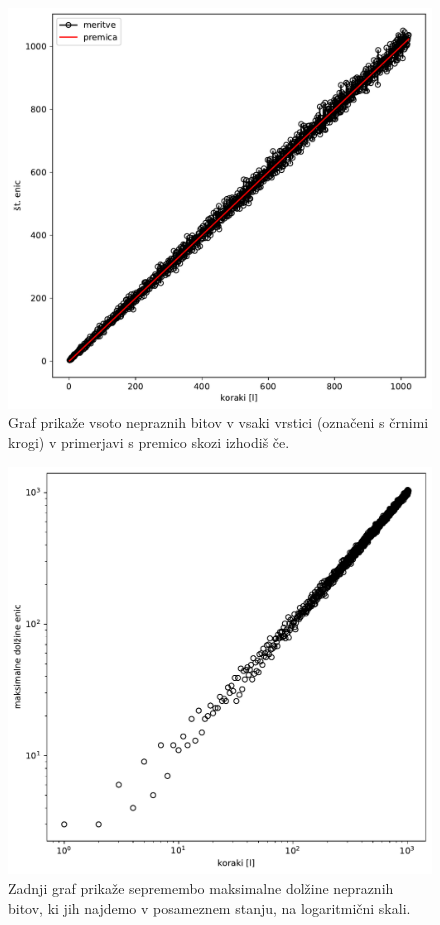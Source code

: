 \documentclass{article}
\begin{document}
\begin{figure}[h]
\begin{center}

    \includegraphics[width=12cm]{vsota.pdf}
\caption{Graf prika\v ze vsoto nepraznih bitov v vsaki vrstici (ozna\v ceni s \v crnimi krogi) v primerjavi s premico skozi izhodi\v s \v ce.}

\end{center}
\end{figure}

\begin{figure}[h]
\begin{center}

    \includegraphics[width=12cm]{skupki.pdf}
\caption{Zadnji graf prika\v ze sepremembo maksimalne dol\v zine nepraznih bitov, ki jih najdemo v posameznem stanju, na logaritmi\v cni skali.}

\end{center}
\end{figure}
\end{document}

